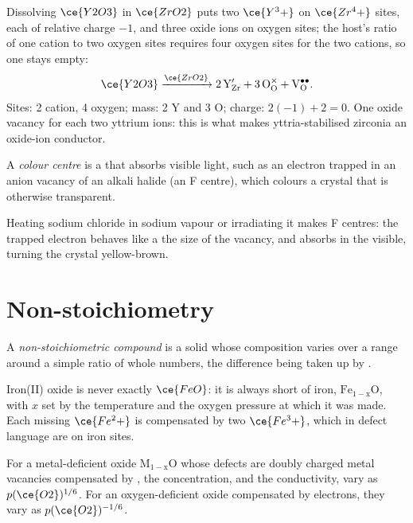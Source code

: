 \begin{example}
Dissolving $\ce{Y2O3}$ in $\ce{ZrO2}$ puts two $\ce{Y^3+}$ on $\ce{Zr^4+}$ sites, each of relative charge $-1$, and
three oxide ions on oxygen sites; the host's ratio of one cation to two oxygen
sites requires four oxygen sites for the two cations, so one stays empty:
\[
  \ce{Y2O3} \xrightarrow{\ce{ZrO2}} \mathrm{2\,Y_{Zr}' + 3\,O_O^{\times} + V_O^{\bullet\bullet}}.
\]
Sites: 2 cation, 4 oxygen; mass: 2 Y and 3 O; charge: $2(-1) + 2 = 0$. One oxide
vacancy for each two yttrium ions: this is what makes yttria-stabilised zirconia
an oxide-ion conductor.
\end{example}

\begin{definition}\label{def:b3:solid-state:colour-centre}
A \emph{colour centre} is a  that absorbs
visible light, such as an electron trapped in an anion vacancy of an alkali
halide (an F centre), which colours a crystal that is otherwise transparent.
\end{definition}

Heating sodium chloride in sodium vapour or irradiating it makes F centres: the
trapped electron behaves like a  the size of the vacancy, and
absorbs in the visible, turning the crystal yellow-brown.

\section{Non-stoichiometry}

\begin{definition}\label{def:b3:solid-state:non-stoichiometric}
A \emph{non-stoichiometric compound} is a
solid whose composition varies over a range around a simple ratio of whole
numbers, the difference being taken up by .
\end{definition}

Iron(II) oxide is never exactly $\ce{FeO}$: it is always short of iron,
$\mathrm{Fe_{1-x}O}$, with $x$ set by the temperature and the oxygen pressure at which it was made. Each missing $\ce{Fe^2+}$ is compensated by two
$\ce{Fe^3+}$, which in defect language are  on iron sites.

\begin{proposition}\label{prop:b3:solid-state:brouwer}
For a metal-deficient oxide $\mathrm{M_{1-x}O}$ whose defects are doubly charged metal vacancies
compensated by , the  concentration, and the conductivity, vary as
$p(\ce{O2})^{1/6}$. For an oxygen-deficient oxide compensated by electrons, they vary as
$p(\ce{O2})^{-1/6}$.
\end{proposition}


